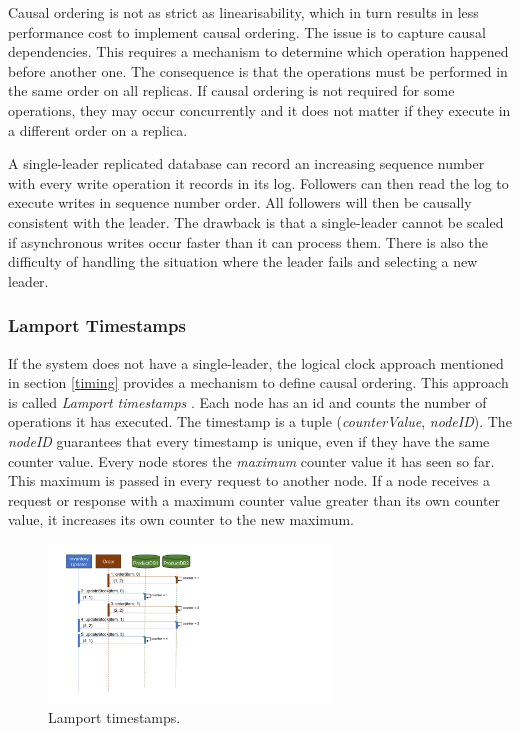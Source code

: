 Causal ordering is not as strict as linearisability, which in turn results in less performance cost to implement causal ordering.
The issue is to capture causal dependencies.
This requires a mechanism to determine which operation happened before another one.
The consequence is that the operations must be performed in the same order on all replicas.
If causal ordering is not required for some operations, they may occur concurrently
and it does not matter if they execute in a different order on a replica.

A single-leader replicated database can record an increasing sequence number with every write operation it records in its log.
Followers can then read the log to execute writes in sequence number order.
All followers will then be causally consistent with the leader.
The drawback is that a single-leader cannot be scaled if asynchronous writes occur faster than it can process them.
There is also the difficulty of handling the situation where the leader fails and selecting a new leader.

\subsubsection{Lamport Timestamps}
If the system does not have a single-leader, the logical clock approach mentioned in section \ref{timing} provides a mechanism to define causal ordering.
This approach is called \emph{Lamport timestamps} \cite{LamportLeslie1978Tcat}.
Each node has an id and counts the number of operations it has executed.
The timestamp is a tuple (\emph{counterValue}, \emph{nodeID}).
The \emph{nodeID} guarantees that every timestamp is unique, even if they have the same counter value.
Every node stores the \emph{maximum} counter value it has seen so far.
This maximum is passed in every request to another node.
If a node receives a request or response with a maximum counter value greater than its own counter value,
it increases its own counter to the new maximum.

\begin{figure}[h!]
    \centering
    \includegraphics[trim=60 189 450 35,clip,width=0.67\textwidth]{diagrams/lamport-timestamp-seq.png}
    \caption{Lamport timestamps.}
    \label{fig:lamport-timestamp-seq}
\end{figure}

